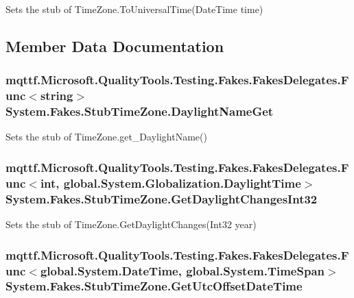 Sets the stub of Time\-Zone.\-To\-Universal\-Time(\-Date\-Time time)



\subsection{Member Data Documentation}
\hypertarget{class_system_1_1_fakes_1_1_stub_time_zone_a782f7fad3c8b609efad3cbbc79715828}{
\subsubsection[{Daylight\-Name\-Get}]{\setlength{\rightskip}{0pt plus 5cm}mqttf.\-Microsoft.\-Quality\-Tools.\-Testing.\-Fakes.\-Fakes\-Delegates.\-Func$<$string$>$ System.\-Fakes.\-Stub\-Time\-Zone.\-Daylight\-Name\-Get}}\label{class_system_1_1_fakes_1_1_stub_time_zone_a782f7fad3c8b609efad3cbbc79715828}


Sets the stub of Time\-Zone.\-get\-\_\-\-Daylight\-Name()

\hypertarget{class_system_1_1_fakes_1_1_stub_time_zone_a7601e66ce1591904508fe6c2459fbf9f}{
\subsubsection[{Get\-Daylight\-Changes\-Int32}]{\setlength{\rightskip}{0pt plus 5cm}mqttf.\-Microsoft.\-Quality\-Tools.\-Testing.\-Fakes.\-Fakes\-Delegates.\-Func$<$int, global.\-System.\-Globalization.\-Daylight\-Time$>$ System.\-Fakes.\-Stub\-Time\-Zone.\-Get\-Daylight\-Changes\-Int32}}\label{class_system_1_1_fakes_1_1_stub_time_zone_a7601e66ce1591904508fe6c2459fbf9f}


Sets the stub of Time\-Zone.\-Get\-Daylight\-Changes(\-Int32 year)

\hypertarget{class_system_1_1_fakes_1_1_stub_time_zone_aad1d52340603297a8d0f7f30076a4a1d}{
\subsubsection[{Get\-Utc\-Offset\-Date\-Time}]{\setlength{\rightskip}{0pt plus 5cm}mqttf.\-Microsoft.\-Quality\-Tools.\-Testing.\-Fakes.\-Fakes\-Delegates.\-Func$<$global.\-System.\-Date\-Time, global.\-System.\-Time\-Span$>$ System.\-Fakes.\-Stub\-Time\-Zone.\-Get\-Utc\-Offset\-Date\-Time}}\label{class_system_1_1_fakes_1_1_stub_time_zone_aad1d52340603297a8d0f7f30076a4a1d}


